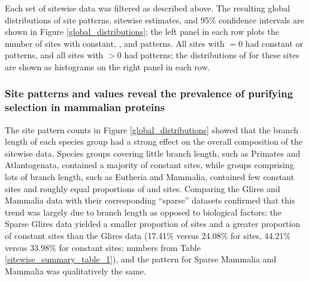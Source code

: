 Each set of sitewise data was filtered as described above. The
resulting global distributions of site patterns, sitewise \omg
estimates, and 95\% confidence intervals are shown in Figure
\ref{global_distributions}; the left panel in each row plots the
number of sites with constant, \syn, and \nsyn patterns. All sites
with \omgml$=0$ had constant or \syn patterns, and all sites with
\omgml$>0$ had \nsyn patterns; the distributions of \omgml for these
\nsyn sites are shown as histograms on the right panel in each row.

\subsubsection{Site patterns and \omgml values reveal the prevalence of purifying selection in mammalian proteins}

The site pattern counts in Figure \ref{global_distributions} showed
that the branch length of each species group had a strong effect on
the overall composition of the sitewise data. Species groups covering
little branch length, such as Primates and Atlantogenata, contained a
majority of constant sites, while groups comprising lots of branch
length, such as Eutheria and Mammalia, contained few constant sites
and roughly equal proportions of \syn and \nsyn sites. Comparing the
Glires and Mammalia data with their corresponding ``sparse'' datasets
confirmed that this trend was largely due to branch length as opposed
to biological factors: the Sparse Glires data yielded a smaller
proportion of \nsyn sites and a greater proportion of constant sites
than the Glires data (17.41\% versus 24.08\% for \nsyn sites, 44.21\%
versus 33.98\% for constant sites; numbers from Table
\ref{sitewise_summary_table_1}), and the pattern for Sparse Mammalia
and Mammalia was qualitatively the same.


